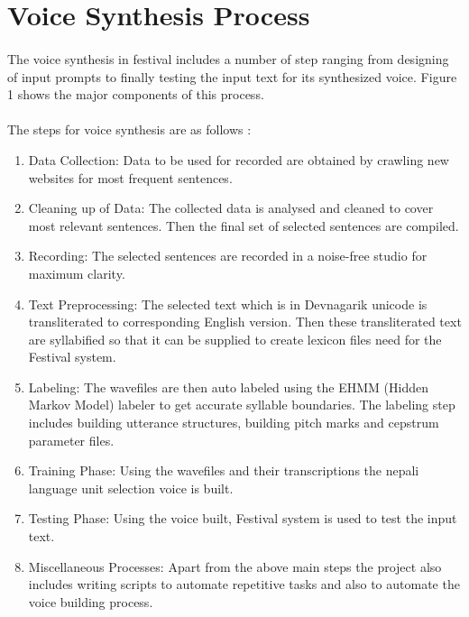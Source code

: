 \documentclass{article}
\begin{document}
	\section{Voice Synthesis Process}
		\paragraph{}
			The voice synthesis in festival includes a number of step ranging from designing of input prompts to finally testing the input text for its synthesized voice. Figure 1 shows the major components of this process.

	\paragraph{}
		The steps for voice synthesis are as follows \cite{HINDITTS:5}:
		\begin{enumerate}
			\item{Data Collection}: Data to be used for recorded are obtained by crawling new websites for most frequent sentences.
			\item{Cleaning up of Data}: The collected data is analysed and cleaned to cover most relevant sentences. Then the final set of selected sentences are compiled.
			\item{Recording}: The selected sentences are recorded in a noise-free studio for maximum clarity.
			\item{Text Preprocessing}: The selected text which is in Devnagarik unicode is transliterated to corresponding English version. Then these transliterated text are syllabified so that it can be supplied to create lexicon files need for the Festival system.
			\item{Labeling}: The wavefiles are then auto labeled using the EHMM (Hidden Markov Model) labeler to get accurate syllable boundaries. The labeling step includes building utterance structures, building pitch marks and cepstrum parameter files.
			\item{Training Phase}: Using the wavefiles and their transcriptions the nepali language unit selection voice is built.
			\item{Testing Phase}: Using the voice built, Festival system is used to test the input text.
			\item{Miscellaneous Processes}: Apart from the above main steps the project also includes writing scripts to automate repetitive tasks and also to automate the voice building process. 

		\end{enumerate} 
\end{document}
